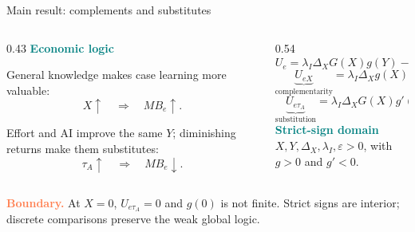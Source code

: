 \documentclass[aspectratio=169,11pt]{beamer}
\newcommand{\key}[1]{\textcolor{Teal}{\textbf{#1}}}
\newcommand{\caveat}[1]{\textcolor{Coral}{\textbf{#1}}}
\begin{document}
\begin{frame}{Main result: complements and substitutes}
\small
\begin{columns}[T,totalwidth=\textwidth]
\begin{column}{0.43\textwidth}
  \key{Economic logic}

  \vspace{0.08cm}
  General knowledge makes case learning more valuable:
  \[
  X\uparrow\quad\Rightarrow\quad MB_e\uparrow.
  \]

  Effort and AI improve the same \(Y\); diminishing returns make them substitutes:
  \[
  \tau_A\uparrow\quad\Rightarrow\quad MB_e\downarrow.
  \]
\end{column}
\begin{column}{0.54\textwidth}
  \[
  U_e=\lambda_I\Delta_XG(X)g(Y)-e^{1/\varepsilon}=0
  \]
  \[
  \underbrace{U_{eX}}_{\text{complementarity}}
  =\lambda_I\Delta_Xg(X)g(Y)>0
  \]
  \[
  \underbrace{U_{e\tau_A}}_{\text{substitution}}
  =\lambda_I\Delta_XG(X)g'(Y)<0
  \]
  \key{Strict-sign domain}\\[-0.05cm]
  \(X,Y,\Delta_X,\lambda_I,\varepsilon>0\), with \(g>0\) and \(g'<0\).
\end{column}
\end{columns}

\vfill
\caveat{Boundary.} At \(X=0\), \(U_{e\tau_A}=0\) and \(g(0)\) is not finite.
Strict signs are interior; discrete comparisons preserve the weak global logic.
\end{frame}
\end{document}
